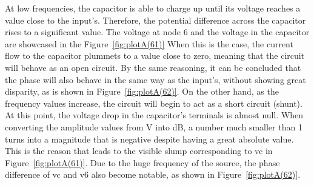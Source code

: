 At low frequencies, the capacitor is able to charge up until its voltage reaches a value close to the input's. Therefore, the potential difference across the capacitor rises to a significant value. The voltage at node 6 and the voltage in the capacitor are showcased in the Figure~\ref{fig:plotA(61)} When this is the case, the current flow to the capacitor plummets to a value close to zero, meaning that the circuit will behave as an open circuit. By the same reasoning, it can be concluded that the phase will also behave in the same way as the input's, without showing great disparity, as is shown in Figure~\ref{fig:plotA(62)}. 
On the other hand, as the frequency values increase, the circuit will begin to act as a short circuit (shunt). At this point, the voltage drop in the capacitor's terminals is almost null. When converting the amplitude values from V into dB, a number much smaller than 1 turns into a magnitude that is negative despite having a great absolute value. This is the reason that leads to the visible slump corresponding to vc in Figure~\ref{fig:plotA(61)}. Due to the huge frequency of the source, the phase difference of vc and v6 also become notable, as shown in Figure~\ref{fig:plotA(62)}.

